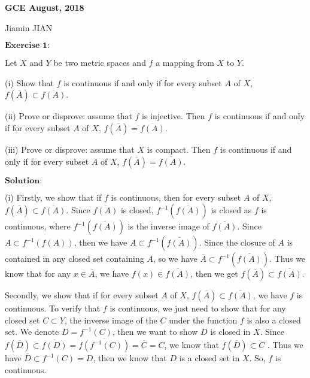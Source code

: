 \documentclass[12pt,a4paper]{ctexart}
\begin{document}
\begin{center}
\textbf{ GCE August, 2018}
\vspace{8pt}

Jiamin JIAN
\end{center}

\vspace{12pt}

$\textbf{Exercise 1:}$

Let $X$ and $Y$ be two metric spaces and $f$ a mapping from $X$ to $Y$.

(i) Show that $f$ is continuous if and only if for every subset $A$ of $X$, $f(\overline{A}) \subset  \overline{f(A)}$.

(ii) Prove or disprove: assume that $f$ is injective. Then $f$ is continuous if and only if for every subset $A$ of $X$, $f(\overline{A}) = \overline{f(A)}$. 

(iii) Prove or disprove: assume that $X$ is compact. Then $f$ is continuous if and only if for every subset $A$ of $X$, $f(\overline{A}) = \overline{f(A)}$. 

\vspace{8pt}

$\textbf{Solution:}$

(i) Firstly, we show that if $f$ is continuous, then for every subset $A$ of $X$, $f(\overline{A}) \subset  \overline{f(A)}$. Since $\overline{f(A)}$ is closed, $f^{-1}(\overline{f(A)})$ is closed as $f$ is continuous, where $f^{-1}(\overline{f(A)})$ is the inverse image of $\overline{f(A)}$. Since $A \subset f^{-1} (f(A))$, then we have $A \subset f^{-1}( \overline{f(A)})$. Since the closure of $A$ is contained in any closed set containing $A$, so we have $\overline{A} \subset f^{-1} (\overline{f(A)})$. Thus we know that for any $x \in \overline{A}$, we have $f(x) \in \overline{f(A)}$, then we get $f(\overline{A}) \subset  \overline{f(A)}$.

Secondly, we show that if for every subset $A$ of $X$, $f(\overline{A}) \subset  \overline{f(A)}$, we have $f$ is continuous. To verify that $f$ is continuous, we just need to show that for any closed set $C \subset Y$, the inverse image of the $C$ under the function $f$ is also a closed set. We denote $D = f^{-1}(C)$, then we want to show $D$ is closed in $X$. Since $f(\overline{D}) \subset \overline{f(D)} = \overline{f(f^{-1}(C))} = \overline{C} = C$, we know that $f(\overline{D}) \subset C$
. Thus we have $\overline{D} \subset f^{-1}(C) = D$, then we know that $D$ is a closed set in $X$. So, $f$ is continuous.
\end{document}
